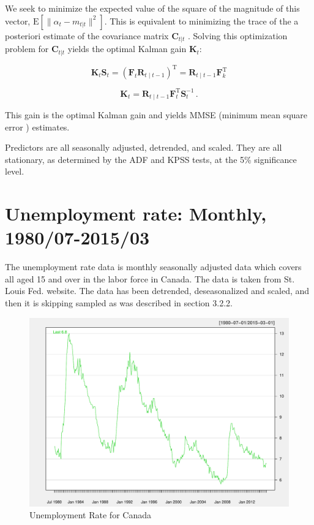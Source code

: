We seek to minimize the expected value of the square of the magnitude of this vector, $\textrm{E}[\|\alpha_{t} - m_{t|t}\|^2]$. This is equivalent to minimizing the trace of the a posteriori estimate of the covariance matrix $\mathbf{C}_{t|t}$ . Solving this optimization problem for $\mathbf{C}_{t|t}$ yields the optimal Kalman gain  $\mathbf{K}_t$:


$$\mathbf{K}_t \mathbf{S}_t = (\mathbf{F}_t \mathbf{R}_{t\mid t-1})^\text{T} = \mathbf{R}_{t\mid t-1} \mathbf{F}_k^\text{T}$$


$$\mathbf{K}_{t} = \mathbf{R}_{t\mid t-1} \mathbf{F}_t^\text{T} \mathbf{S}_t^{-1} \, .$$


This gain  is  the optimal Kalman gain and yields MMSE (minimum mean square error ) estimates.  






\label{chapter:appendixB}

Predictors are all seasonally adjusted, detrended, and scaled. They are all stationary, as determined by  the ADF and KPSS tests, at the 5\% significance level. 


\section{Unemployment rate: Monthly, 1980/07-2015/03}  


The unemployment rate data is monthly seasonally adjusted data which covers all aged 15 and over in the labor force in Canada. The data is taken from St. Louis Fed. website. The data has been detrended, deseasonalized and scaled, and then it is skipping sampled as was described in section 3.2.2. 

\begin{figure}[h]
	\centering
	\includegraphics[width=0.7\linewidth]{Figures/labor-report}
	\caption{Unemployment Rate for Canada}
	\label{fig:labor-report}
\end{figure}


